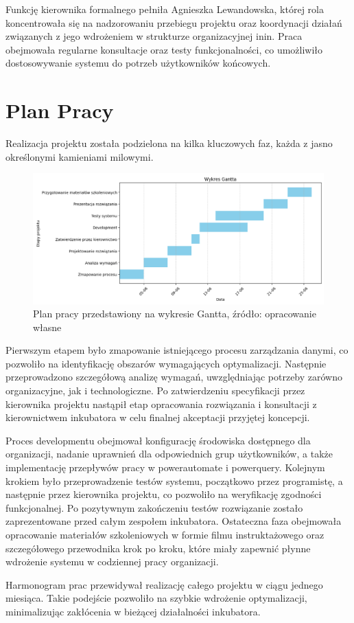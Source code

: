 Funkcję kierownika formalnego pełniła Agnieszka Lewandowska, której rola koncentrowała się na nadzorowaniu przebiegu projektu oraz koordynacji działań związanych z jego wdrożeniem w strukturze organizacyjnej \gls{inin}. Praca obejmowała regularne konsultacje oraz testy funkcjonalności, co umożliwiło dostosowywanie systemu do potrzeb użytkowników końcowych.

\section{Plan Pracy}
Realizacja projektu została podzielona na kilka kluczowych faz, każda z jasno określonymi kamieniami milowymi. 

\begin{figure}[!hb]
	\centering \includegraphics[width=1\linewidth]{rysunki/gantt2.png}
	\caption{Plan pracy przedstawiony na wykresie Gantta, źródło: opracowanie własne}
	\label{rys:registration}
\end{figure}

Pierwszym etapem było zmapowanie istniejącego procesu zarządzania danymi, co pozwoliło na identyfikację obszarów wymagających optymalizacji. Następnie przeprowadzono szczegółową analizę wymagań, uwzględniając potrzeby zarówno organizacyjne, jak i technologiczne. Po zatwierdzeniu specyfikacji przez kierownika projektu nastąpił etap opracowania rozwiązania i konsultacji z kierownictwem inkubatora w celu finalnej akceptacji przyjętej koncepcji.

Proces developmentu obejmował konfigurację środowiska dostępnego dla organizacji, nadanie uprawnień dla odpowiednich grup użytkowników, a także implementację przepływów pracy w \gls{powerautomate} i \gls{powerquery}. Kolejnym krokiem było przeprowadzenie testów systemu, początkowo przez programistę, a następnie przez kierownika projektu, co pozwoliło na weryfikację zgodności funkcjonalnej. Po pozytywnym zakończeniu testów rozwiązanie zostało zaprezentowane przed całym zespołem inkubatora. Ostateczna faza obejmowała opracowanie materiałów szkoleniowych w formie filmu instruktażowego oraz szczegółowego przewodnika krok po kroku, które miały zapewnić płynne wdrożenie systemu w codziennej pracy organizacji.

Harmonogram prac przewidywał realizację całego projektu w ciągu jednego miesiąca. Takie podejście pozwoliło na szybkie wdrożenie optymalizacji, minimalizując zakłócenia w bieżącej działalności inkubatora.
